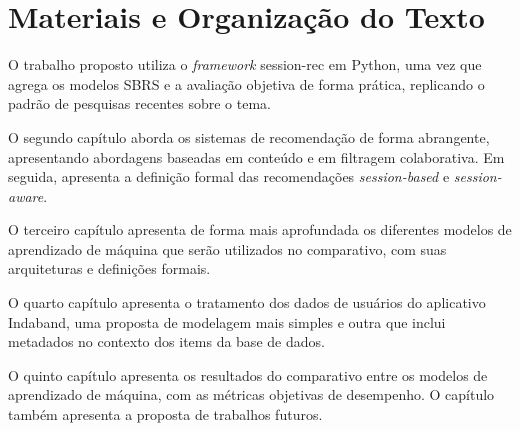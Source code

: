 \section{Materiais e Organização do Texto}

O trabalho proposto utiliza o \textit{framework} session-rec \cite{sessionrec}
em Python, uma vez que agrega os modelos SBRS e a avaliação objetiva de forma
prática, replicando o padrão de pesquisas recentes sobre o tema. 

O segundo capítulo aborda os sistemas de recomendação de forma abrangente,
apresentando abordagens baseadas em conteúdo e em filtragem
colaborativa. Em seguida, apresenta a definição formal das recomendações
\textit{session-based} e \textit{session-aware}.

O terceiro capítulo apresenta de forma mais aprofundada os diferentes modelos de
aprendizado de máquina que serão utilizados no comparativo, com suas
arquiteturas e definições formais.

O quarto capítulo apresenta o tratamento dos dados de usuários do aplicativo
Indaband, uma proposta de modelagem mais simples e outra que inclui metadados no
contexto dos items da base de dados.

O quinto capítulo apresenta os resultados do comparativo entre os modelos de
aprendizado de máquina, com as métricas objetivas de desempenho. O capítulo
também apresenta a proposta de trabalhos futuros.